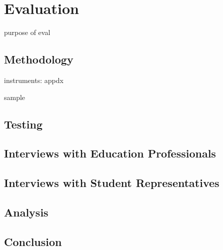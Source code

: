 \chapter{Evaluation}

purpose of eval

\section{Methodology}

instruments: appdx

sample

\section{Testing}

\section{Interviews with Education Professionals}

\section{Interviews with Student Representatives}

\section{Analysis}

\section{Conclusion}